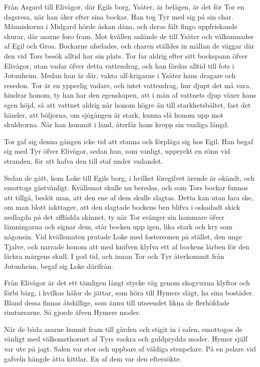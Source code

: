 Från Asgard till Elivågor, där Egils borg, Ysäter, är belägen, är det
för Tor en dagsresa, när han åker efter sina bockar. Han tog Tyr med sig
på sin char. Människorna i Midgard hörde åskan dåna, och deras fält
fingo uppfriskande skurar, där asarne foro fram. Mot kvällen anlände de
till Ysäter och välkomnades af Egil och Groa. Bockarne afselades, och
charen ställdes in mällan de väggar där den vid Tors besök alltid har
sin plats. Tor far aldrig efter sitt bockspann öfver Elivågor, utan
vadar öfver detta vattendrag, och han färdas alltid till fots i
Jotunheim. Medan han är där, vakta alf-krigarne i Ysäter hans dragare
och resedon. Tor är en ypperlig vadare, och intet vattendrag, hur djupt
det må vara, hindrar honom, ty han har den egenskapen, att i mån af
vattnets djup växer hans egen höjd, så att vattnet aldrig når honom
högre än till starkhetsbältet, fast det händer, att böljorna, om
sjögången är stark, kunna slå honom upp mot skuldrorna. När han kommit i
land, återfår hans kropp sin vanliga längd.

Tor gaf sig denna gången icke tid att stanna och förpläga sig hos Egil.
Han begaf sig med Tyr öfver Elivågor, sedan han, som vanligt, uppryckt
en rönn vid stranden, för att hafva den till staf under vadandet.

Sedan de gått, kom Loke till Egils borg, i hvilket föregifvet ärende är
okändt, och emottogs gästvänligt. Kvällsmat skulle nu beredas, och som
Tors bockar funnos att tillgå, beslöt man, att den ene af dem skulle
slagtas. Detta kan utan fara ske, om man blott iakttager, att den
slagtade bockens ben blifva i oskadadt skick nedlagda på det afflådda
skinnet, ty när Tor svänger sin hammare öfver lämningarna och signar
dem, står bocken upp igen, lika stark och kry som någonsin. Vid
kvällsmaten pratade Loke med fostersonen på stället, den unge Tjalve,
och narrade honom att med knifven klyfva ett af bockens lårben för den
läckra märgens skull. I god tid, och innan Tor och Tyr återkommit från
Jotunheim, begaf sig Loke därifrån.

Från Elivågor är det ett tämligen långt stycke väg genom skogvuxna
klyftor och förbi bärg, i hvilkas hålor de jättar, som höra till Hymers
slägt, ha sina bostäder. Bland dessa finnas åtskillige, som ännu till
utseendet likna de flerhöfdade rimtursarne. Så gjorde äfven Hymers
moder.

När de båda asarne hunnit fram till gården och stigit in i salen,
emottogos de vänligt med välkomsthornet af Tyrs vackra och guldprydda
moder. Hymer själf var ute på jagt. Salen var stor och uppbars af
väldiga stenpelare. På en pelare vid gafveln hängde åtta kittlar. En af
dem var den eftersökte.


